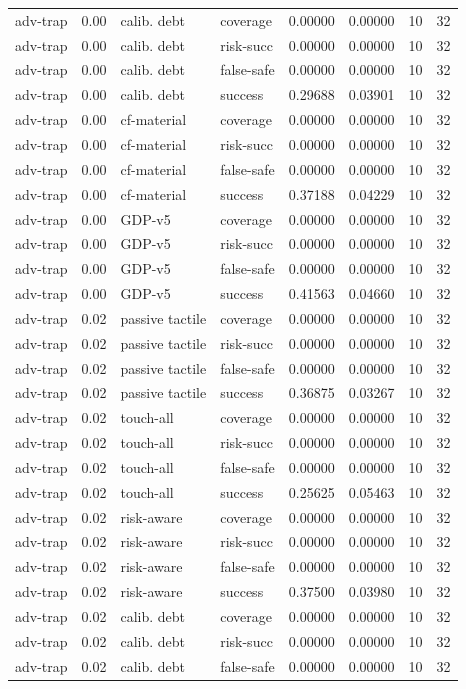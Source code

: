 \documentclass{article}
\begin{document}
\begin{center}
\begin{longtable}{llllllll}
adv-trap & 0.00 & calib. debt & coverage & 0.00000 & 0.00000 & 10 & 32 \\
adv-trap & 0.00 & calib. debt & risk-succ & 0.00000 & 0.00000 & 10 & 32 \\
adv-trap & 0.00 & calib. debt & false-safe & 0.00000 & 0.00000 & 10 & 32 \\
adv-trap & 0.00 & calib. debt & success & 0.29688 & 0.03901 & 10 & 32 \\
adv-trap & 0.00 & cf-material & coverage & 0.00000 & 0.00000 & 10 & 32 \\
adv-trap & 0.00 & cf-material & risk-succ & 0.00000 & 0.00000 & 10 & 32 \\
adv-trap & 0.00 & cf-material & false-safe & 0.00000 & 0.00000 & 10 & 32 \\
adv-trap & 0.00 & cf-material & success & 0.37188 & 0.04229 & 10 & 32 \\
adv-trap & 0.00 & GDP-v5 & coverage & 0.00000 & 0.00000 & 10 & 32 \\
adv-trap & 0.00 & GDP-v5 & risk-succ & 0.00000 & 0.00000 & 10 & 32 \\
adv-trap & 0.00 & GDP-v5 & false-safe & 0.00000 & 0.00000 & 10 & 32 \\
adv-trap & 0.00 & GDP-v5 & success & 0.41563 & 0.04660 & 10 & 32 \\
adv-trap & 0.02 & passive tactile & coverage & 0.00000 & 0.00000 & 10 & 32 \\
adv-trap & 0.02 & passive tactile & risk-succ & 0.00000 & 0.00000 & 10 & 32 \\
adv-trap & 0.02 & passive tactile & false-safe & 0.00000 & 0.00000 & 10 & 32 \\
adv-trap & 0.02 & passive tactile & success & 0.36875 & 0.03267 & 10 & 32 \\
adv-trap & 0.02 & touch-all & coverage & 0.00000 & 0.00000 & 10 & 32 \\
adv-trap & 0.02 & touch-all & risk-succ & 0.00000 & 0.00000 & 10 & 32 \\
adv-trap & 0.02 & touch-all & false-safe & 0.00000 & 0.00000 & 10 & 32 \\
adv-trap & 0.02 & touch-all & success & 0.25625 & 0.05463 & 10 & 32 \\
adv-trap & 0.02 & risk-aware & coverage & 0.00000 & 0.00000 & 10 & 32 \\
adv-trap & 0.02 & risk-aware & risk-succ & 0.00000 & 0.00000 & 10 & 32 \\
adv-trap & 0.02 & risk-aware & false-safe & 0.00000 & 0.00000 & 10 & 32 \\
adv-trap & 0.02 & risk-aware & success & 0.37500 & 0.03980 & 10 & 32 \\
adv-trap & 0.02 & calib. debt & coverage & 0.00000 & 0.00000 & 10 & 32 \\
adv-trap & 0.02 & calib. debt & risk-succ & 0.00000 & 0.00000 & 10 & 32 \\
adv-trap & 0.02 & calib. debt & false-safe & 0.00000 & 0.00000 & 10 & 32 \\
\bottomrule
\end{longtable}
\renewcommand{\arraystretch}{1.0}
\end{center}
\end{document}
